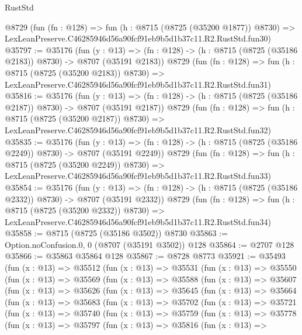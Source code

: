\begin{lexlean}{RustStd}
\begin{coremodule}
    @8729
    (fun (fn : @128) =>
    fun (h : @8715 (@8725 (@35200 @1877)) @8730) =>
    LexLeanPreserve.C46285946d56a90fcf91eb9b5d1b37c11.R2.RustStd.fun30)
@35797 := @35176
    (fun (y : @13) =>
    (fn : @128) -> (h : @8715 (@8725 (@35186 @2183)) @8730) -> @8707 (@35191 @2183))
    @8729
    (fun (fn : @128) =>
    fun (h : @8715 (@8725 (@35200 @2183)) @8730) =>
    LexLeanPreserve.C46285946d56a90fcf91eb9b5d1b37c11.R2.RustStd.fun31)
@35816 := @35176
    (fun (y : @13) =>
    (fn : @128) -> (h : @8715 (@8725 (@35186 @2187)) @8730) -> @8707 (@35191 @2187))
    @8729
    (fun (fn : @128) =>
    fun (h : @8715 (@8725 (@35200 @2187)) @8730) =>
    LexLeanPreserve.C46285946d56a90fcf91eb9b5d1b37c11.R2.RustStd.fun32)
@35835 := @35176
    (fun (y : @13) =>
    (fn : @128) -> (h : @8715 (@8725 (@35186 @2249)) @8730) -> @8707 (@35191 @2249))
    @8729
    (fun (fn : @128) =>
    fun (h : @8715 (@8725 (@35200 @2249)) @8730) =>
    LexLeanPreserve.C46285946d56a90fcf91eb9b5d1b37c11.R2.RustStd.fun33)
@35854 := @35176
    (fun (y : @13) =>
    (fn : @128) -> (h : @8715 (@8725 (@35186 @2332)) @8730) -> @8707 (@35191 @2332))
    @8729
    (fun (fn : @128) =>
    fun (h : @8715 (@8725 (@35200 @2332)) @8730) =>
    LexLeanPreserve.C46285946d56a90fcf91eb9b5d1b37c11.R2.RustStd.fun34)
@35858 := @8715 (@8725 (@35186 @3502)) @8730
@35863 := Option.noConfusion.{0, 0} (@8707 (@35191 @3502)) @128
@35864 := @2707 @128
@35866 := @35863 @35864 @128
@35867 := @8728 @8773
@35921 := @35493
    (fun (x : @13) =>
    @35512
      (fun (x : @13) =>
      @35531
        (fun (x : @13) =>
        @35550
          (fun (x : @13) =>
          @35569
            (fun (x : @13) =>
            @35588
              (fun (x : @13) =>
              @35607
                (fun (x : @13) =>
                @35626
                  (fun (x : @13) =>
                  @35645
                    (fun (x : @13) =>
                    @35664
                      (fun (x : @13) =>
                      @35683
                        (fun (x : @13) =>
                        @35702
                          (fun (x : @13) =>
                          @35721
                            (fun (x : @13) =>
                            @35740
                              (fun (x : @13) =>
                              @35759
                                (fun (x : @13) =>
                                @35778
                                  (fun (x : @13) =>
                                  @35797
                                    (fun (x : @13) =>
                                    @35816
                                      (fun (x : @13) =>

\end{coremodule}
\end{lexlean}
